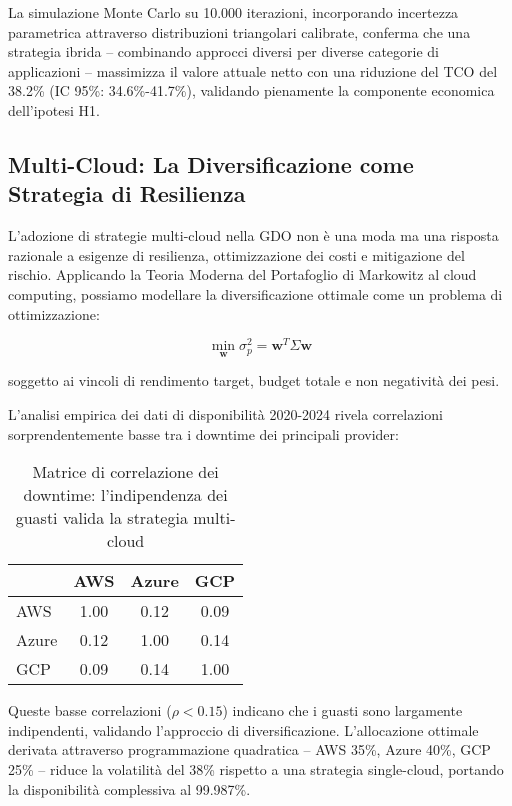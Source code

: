 \documentclass[12pt,a4paper,twoside]{book}
\begin{document}
La simulazione Monte Carlo su 10.000 iterazioni, incorporando incertezza parametrica attraverso distribuzioni triangolari calibrate, conferma che una strategia ibrida – combinando approcci diversi per diverse categorie di applicazioni – massimizza il valore attuale netto con una riduzione del TCO del 38.2\% (IC 95\%: 34.6\%-41.7\%), validando pienamente la componente economica dell'ipotesi H1.

\subsection{Multi-Cloud: La Diversificazione come Strategia di Resilienza}

L'adozione di strategie multi-cloud nella GDO non è una moda ma una risposta razionale a esigenze di resilienza, ottimizzazione dei costi e mitigazione del rischio. Applicando la Teoria Moderna del Portafoglio di Markowitz\autocite{tang2024portfolio} al cloud computing, possiamo modellare la diversificazione ottimale come un problema di ottimizzazione:

\begin{equation}
\min_{\mathbf{w}} \sigma^2_p = \mathbf{w}^T\Sigma\mathbf{w}
\label{eq:portfolio}
\end{equation}

soggetto ai vincoli di rendimento target, budget totale e non negatività dei pesi.

L'analisi empirica dei dati di disponibilità 2020-2024\autocite{uptime2024} rivela correlazioni sorprendentemente basse tra i downtime dei principali provider:

\begin{table}[htbp]
\centering
\caption{Matrice di correlazione dei downtime: l'indipendenza dei guasti valida la strategia multi-cloud}
\label{tab:downtime_correlation}
\begin{tabular}{lccc}
\toprule
 & \textbf{AWS} & \textbf{Azure} & \textbf{GCP} \\
\midrule
AWS & 1.00 & 0.12 & 0.09 \\
Azure & 0.12 & 1.00 & 0.14 \\
GCP & 0.09 & 0.14 & 1.00 \\
\bottomrule
\end{tabular}
\end{table}

Queste basse correlazioni ($\rho < 0.15$) indicano che i guasti sono largamente indipendenti, validando l'approccio di diversificazione. L'allocazione ottimale derivata attraverso programmazione quadratica – AWS 35\%, Azure 40\%, GCP 25\% – riduce la volatilità del 38\% rispetto a una strategia single-cloud, portando la disponibilità complessiva al 99.987\%.
\end{document}
